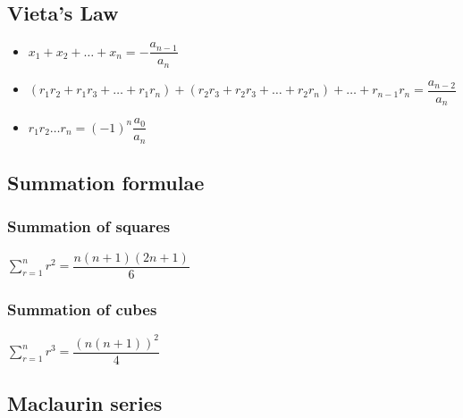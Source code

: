 \subsection{Vieta's Law}
\begin{itemize}
	\item $x_1+x_2+\dots+x_n=-\dfrac{a_{n-1}}{a_n}$
	\item $(r_1r_2+r_1r_3+\dots+r_1r_n)+(r_2r_3+r_2r_3+\dots+r_2r_n)+\dots+r_{n-1}r_n=\dfrac{a_{n-2}}{a_n}$
	\item $r_1r_2\dots r_n=(-1)^n\dfrac{a_0}{a_n}$
\end{itemize}
\subsection{Summation formulae}
\subsubsection{Summation of squares}
$\sum_{r=1}^{n} r^2=\dfrac{n(n+1)(2n+1)}{6}$ 
\subsubsection{Summation of cubes}
$\sum_{r=1}^{n} r^3=\dfrac{(n(n+1))^2}{4}$
\subsection{Maclaurin series}